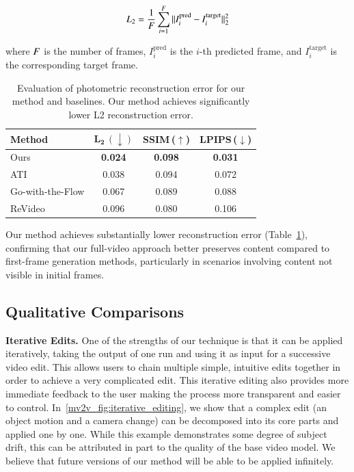 \begin{equation}
L_2 = \frac{1}{F} \sum_{i=1}^{F} \|I_i^{\text{pred}} - I_i^{\text{target}}\|_2^2
\end{equation}

where $F$ is the number of frames,
$I_i^{\text{pred}}$ is the $i$-th predicted frame,
and $I_i^{\text{target}}$ is the corresponding target frame.

\begin{table}[h]
\centering
\begin{tabular}{l|c|c|c}
\hline
\textbf{Method} & $\mathbf{L_2}\,(\downarrow)$ & \textbf{SSIM}\,($\uparrow$) & \textbf{LPIPS}\,($\downarrow$) \\
\hline
Ours               & \textbf{0.024} & \textbf{0.098} & \textbf{0.031} \\
ATI                & 0.038 & 0.094 & 0.072 \\
Go-with-the-Flow   & 0.067 & 0.089 & 0.088 \\
ReVideo            & 0.096 & 0.080 & 0.106 \\
\hline
\end{tabular}
\caption[Quantitative evaluation of MotionV2V]{Evaluation of photometric reconstruction error for our method and baselines. Our method achieves significantly lower L2 reconstruction error.}
\label{mv2v_tab:quantitative}
\end{table}

Our method achieves substantially lower reconstruction error (Table~\ref{mv2v_tab:quantitative}),
confirming that our full-video approach better preserves content compared to first-frame generation methods,
particularly in scenarios involving content not visible in initial frames.

\subsection{Qualitative Comparisons}

\noindent \textbf{Iterative Edits.}
One of the strengths of our technique is that it can be applied iteratively, taking the output of one run and using it as input for a successive video edit. This allows users to chain multiple simple, intuitive edits together in order to achieve a very complicated edit. This iterative editing also provides more immediate feedback to the user making the process more transparent and easier to control. In~\cref{mv2v_fig:iterative_editing}, we show that a complex edit (an object motion and a camera change) can be decomposed into its core parts and applied one by one. While this example demonstrates some degree of subject drift, this can be attributed in part to the quality of the base video model. We believe that future versions of our method will be able to be applied infinitely.

